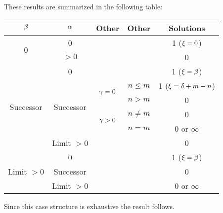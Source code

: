 {{These results are summarized in the following table:
\begin{center}
  \begin{tabular}{|c|c|c|c|c|}
    \hline
    $\beta$                        & $\alpha$                       & Other                     & Other      & Solutions             \\
    \hline
    \multirow{2}{*}{0}          & 0                          &                           &            & 1 ($\xi = 0$)          \\
    \cline{2-5}
                                & $>0$                       &                           &            & 0                     \\
    \hline
    \multirow{6}{*}{Successor}  & 0                          &                           &            & 1 ($\xi = \beta$)         \\
    \cline{2-5}
                                & \multirow{4}{*}{Successor} & \multirow{2}{*}{$\gamma = 0$} & $n \leq m$ & 1 ($\xi = \delta + m - n$) \\
    \cline{4-5}
                                &                            &                           & $n > m$    & 0                     \\
    \cline{3-5}
                                &                            & \multirow{2}{*}{$\gamma > 0$} & $n \neq m$ & 0                     \\
    \cline{4-5}
                                &                            &                           & $n = m$    & 0 or $\infty$         \\
    \cline{2-5}
                                & Limit $>0$                 &                           &            & 0                     \\
    \hline
    \multirow{3}{*}{Limit $>0$} & 0                          &                           &            & 1 ($\xi =\beta$)          \\
    \cline{2-5}
                                & Successor                  &                           &            & 0                     \\
    \cline{2-5}
                                & Limit $>0$                 &                           &            & 0 or $\infty$         \\
    \hline
  \end{tabular}
\end{center}

Since this case structure is exhaustive the result follows.
}
}


